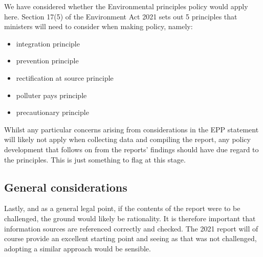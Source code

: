 \documentclass[
]{book}
\providecommand{\tightlist}{%
  \setlength{\itemsep}{0pt}\setlength{\parskip}{0pt}}
\begin{document}
We have considered whether the Environmental principles policy would apply here. Section 17(5) of the Environment Act 2021 sets out 5 principles that ministers will need to consider when making policy, namely:

\begin{itemize}
\tightlist
\item
  integration principle
\item
  prevention principle
\item
  rectification at source principle
\item
  polluter pays principle
\item
  precautionary principle
\end{itemize}

Whilst any particular concerns arising from considerations in the EPP statement will likely not apply when collecting data and compiling the report, any policy development that follows on from the reports' findings should have due regard to the principles. This is just something to flag at this stage.

\hypertarget{general-considerations}{%
\subsection{General considerations}\label{general-considerations}}

Lastly, and as a general legal point, if the contents of the report were to be challenged, the ground would likely be rationality. It is therefore important that information sources are referenced correctly and checked. The 2021 report will of course provide an excellent starting point and seeing as that was not challenged, adopting a similar approach would be sensible.

  
\end{document}
